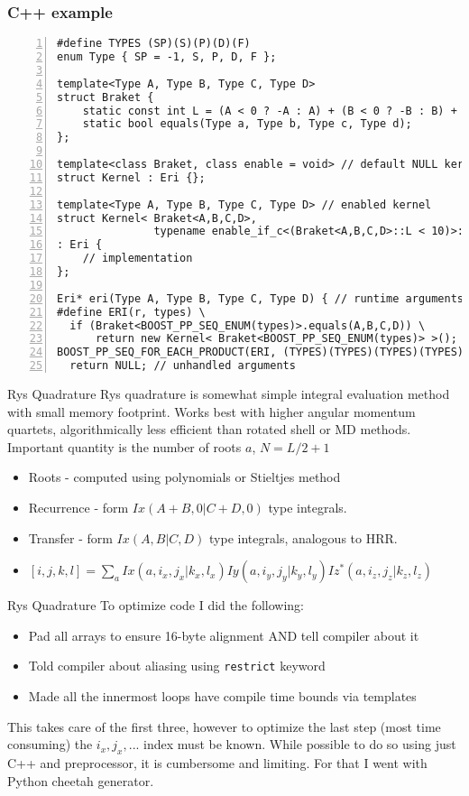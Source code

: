\documentclass{beamer}
\begin{document}
\begin{frame}[fragile]
\frametitle{C++ example}
\begin{lstlisting}[caption=C++ example, numbers=left]
#define TYPES (SP)(S)(P)(D)(F)
enum Type { SP = -1, S, P, D, F };

template<Type A, Type B, Type C, Type D>
struct Braket {
    static const int L = (A < 0 ? -A : A) + (B < 0 ? -B : B) + ...;
    static bool equals(Type a, Type b, Type c, Type d);
};

template<class Braket, class enable = void> // default NULL kernel
struct Kernel : Eri {};

template<Type A, Type B, Type C, Type D> // enabled kernel
struct Kernel< Braket<A,B,C,D>,
               typename enable_if_c<(Braket<A,B,C,D>::L < 10)>::type >
: Eri {
    // implementation
};

Eri* eri(Type A, Type B, Type C, Type D) { // runtime arguments
#define ERI(r, types) \
  if (Braket<BOOST_PP_SEQ_ENUM(types)>.equals(A,B,C,D)) \
      return new Kernel< Braket<BOOST_PP_SEQ_ENUM(types)> >();
BOOST_PP_SEQ_FOR_EACH_PRODUCT(ERI, (TYPES)(TYPES)(TYPES)(TYPES))
  return NULL; // unhandled arguments
\end{lstlisting}
\end{frame}


\begin{frame}{Rys Quadrature}
  Rys quadrature is somewhat simple integral evaluation method with
  small memory footprint.  Works best with higher angular momentum
  quartets, algorithmically less efficient than rotated shell or MD
  methods.  Important quantity is the number of roots $a$, $N = L/2+1$
  \begin{itemize}
  \item Roots - computed using polynomials or Stieltjes method
  \item Recurrence - form $Ix(A+B,0|C+D,0)$ type integrals.
  \item Transfer - form $Ix(A,B|C,D)$ type integrals, analogous to HRR.
  \item $[i,j,k,l] = \sum_a Ix(a,i_x,j_x|k_x,l_x) Iy(a,i_y,j_y|k_y,l_y) Iz^*(a,i_z,j_z|k_z,l_z)$
\end{itemize}
\end{frame}

\begin{frame}{Rys Quadrature}
  To optimize code I did the following:
\begin{itemize}
  \item Pad all arrays to ensure 16-byte alignment AND tell compiler
    about it
  \item Told compiler about aliasing using {\tt restrict} keyword
\item Made all the innermost loops have compile time bounds via
  templates
\end{itemize}
This takes care of the first three, however to optimize the last step
(most time consuming) the $i_x,j_x,...$  index must be known.
While possible to do so using just C++ and preprocessor, it is
cumbersome and limiting.
For that I went with Python cheetah generator.
\end{frame}
\end{document}
